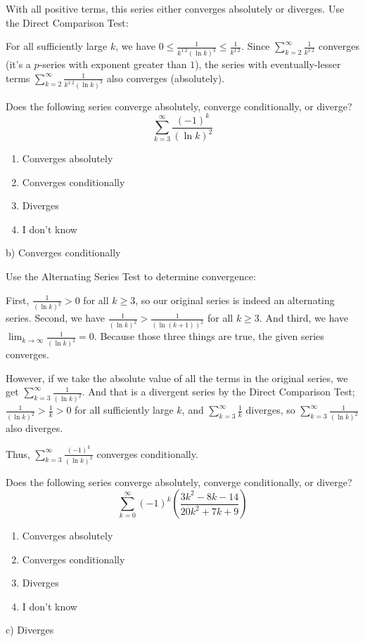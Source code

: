\documentclass[addpoints,12pt,answers]{exam}
\begin{document}
\begin{questions}
\begin{solution}
    With all positive terms, this series either converges absolutely or diverges. Use the Direct Comparison Test:
    
    For all sufficiently large $k$, we have $\displaystyle 0\le\frac{1}{k^{1.2}(\ln k)^3}\le\frac{1}{k^{1.2}}$. Since $\displaystyle\sum_{k=2}^\infty \frac{1}{k^{1.2}}$ converges (it's a $p$-series with exponent greater than $1$), the series with eventually-lesser terms $\displaystyle\sum_{k=2}^\infty\frac{1}{k^{1.2}(\ln k)^3}$ also converges (absolutely).
  \end{solution}
  \newpage
  \question
  Does the following series converge absolutely, converge conditionally, or diverge?
  $$\sum_{k=3}^\infty\frac{(-1)^k}{(\ln k)^2}$$
  \begin{enumerate}[label=\alph*)]
    \item
    Converges absolutely
    \item
    Converges conditionally
    \item
    Diverges
    \item
    I don't know
  \end{enumerate}
  \begin{solution}
    b) Converges conditionally
        
    Use the Alternating Series Test to determine convergence:
    
    First, $\displaystyle\frac{1}{(\ln k)^2}>0$ for all $k\ge 3$, so our original series is indeed an alternating series. Second, we have $\displaystyle\frac{1}{(\ln k)^2}>\frac{1}{(\ln(k+1))^2}$ for all $k\ge 3$. And third, we have $\displaystyle\lim_{k\to\infty}\frac{1}{(\ln k)^2}=0$. Because those three things are true, the given series converges.
    
    However, if we take the absolute value of all the terms in the original series, we get $\displaystyle\sum_{k=3}^\infty\frac{1}{(\ln k)^2}$. And that is a divergent series by the Direct Comparison Test; $\displaystyle\frac{1}{(\ln k)^2}>\frac{1}{k}>0$ for all sufficiently large $k$, and $\displaystyle\sum_{k=3}^\infty\frac{1}{k}$ diverges, so $\displaystyle\sum_{k=3}^\infty\frac{1}{(\ln k)^2}$ also diverges.
    
    Thus, $\displaystyle\sum_{k=3}^\infty\frac{(-1)^k}{(\ln k)^2}$ converges conditionally.
  \end{solution}
  \newpage
  \question
  Does the following series converge absolutely, converge conditionally, or diverge?
  $$\sum_{k=0}^\infty(-1)^k\left(\frac{3k^2-8k-14}{20k^2+7k+9}\right)$$
  \begin{enumerate}[label=\alph*)]
    \item
    Converges absolutely
    \item
    Converges conditionally
    \item
    Diverges
    \item
    I don't know
  \end{enumerate}
  \begin{solution}
    c) Diverges
        

\end{solution}
\end{questions}
\end{document}
